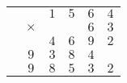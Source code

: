 \documentclass{standalone}
\begin{document}
\begin{tabular}{cccccc}
	& & $1$ & $5$ & $6$ & $4$ \\
	& $\times$ &  & & $6$ & $3$ \\ \hline
	& & $4$ & $6$ & $9$ & $2$ \\     
	&$9$ & $3$ & $8$ & $4$ & \\ \hline
	
	& $9$ & $8$ & $5$ & $3$ & $2$ 
\end{tabular}
\end{document}
